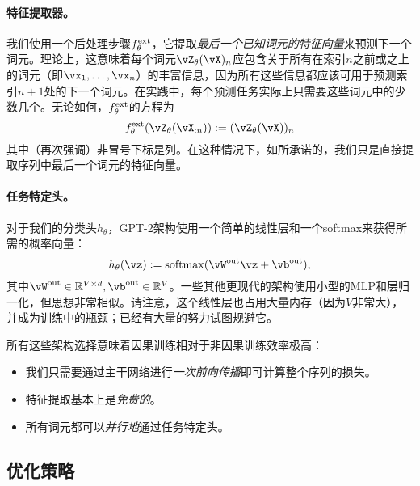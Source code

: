 \documentclass[../../book-main.tex]{subfiles}
\begin{document}
\paragraph{特征提取器。} 我们使用一个后处理步骤\(f_{\theta}^{\mathrm{ext}}\)，它提取\textit{最后一个已知词元的特征向量}来预测下一个词元。理论上，这意味着每个词元\(\vZ_{\theta}(\vX)_{n}\)应包含关于所有在索引\(n\)之前或之上的词元（即\(\vx_{1}, \dots, \vx_{n}\)）的丰富信息，因为所有这些信息都应该可用于预测索引\(n + 1\)处的下一个词元。在实践中，每个预测任务实际上只需要这些词元中的少数几个。无论如何，\(f_{\theta}^{\mathrm{ext}}\)的方程为
\begin{equation}
    f_{\theta}^{\ext}(\vZ_{\theta}(\vX_{:n})) := (\vZ_{\theta}(\vX))_{n}
\end{equation}
其中（再次强调）非冒号下标是列。在这种情况下，如所承诺的，我们只是直接提取序列中最后一个词元的特征向量。

\paragraph{任务特定头。} 对于我们的分类头\(h_{\theta}\)，GPT-2架构使用一个简单的线性层和一个softmax来获得所需的概率向量：
\begin{equation}
    h_{\theta}(\vz) := \softmax(\vW^{\out}\vz + \vb^{\out}),
\end{equation}
其中\(\vW^{\out} \in \R^{V \times d}, \vb^{\out} \in \R^{V}\)。一些其他更现代的架构使用小型的MLP和层归一化，但思想非常相似。请注意，这个线性层也占用大量内存（因为\(V\)非常大），并成为训练中的瓶颈；已经有大量的努力试图规避它。

所有这些架构选择意味着因果训练相对于非因果训练效率极高：
\begin{itemize}
    \item 我们只需要通过主干网络进行\textit{一次前向传播}即可计算整个序列的损失。
    \item 特征提取基本上是\textit{免费的}。
    \item 所有词元都可以\textit{并行地}通过任务特定头。
\end{itemize}

\subsection{优化策略}
\end{document}
